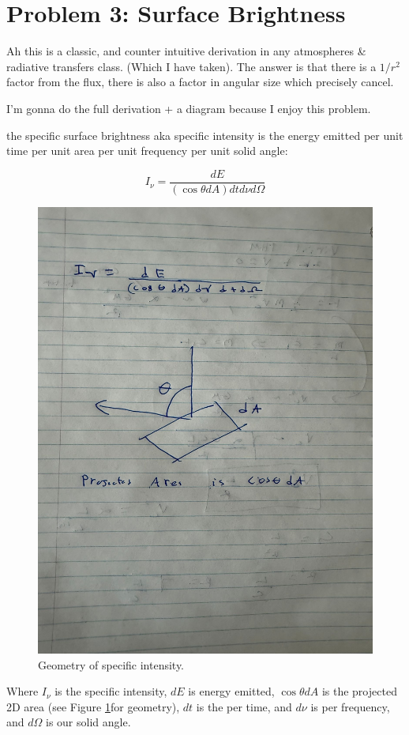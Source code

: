 \section*{Problem 3: Surface Brightness}

Ah this is a classic, and counter intuitive derivation in any atmospheres \& radiative transfers class.  (Which I have taken). The answer is that there is a $1/r^2$ factor from the flux, there is also a factor in angular size  which precisely cancel. 

I'm gonna do the full derivation + a diagram because I enjoy this problem. 

the specific surface brightness aka specific intensity is the energy emitted per unit time per unit area per unit frequency per unit solid angle:

\begin{equation}
    I_\nu = \frac{dE}{(\cos\theta dA)dtd\nu d\Omega}
\end{equation}

\begin{figure}
    \centering
    \includegraphics[width=0.75\linewidth]{images/problem_3_diagram.jpeg}
    \caption{Geometry of specific intensity.}
    \label{fig:probem_3_diagram}
\end{figure}

Where $ I_\nu$ is the specific intensity, $dE$ is energy emitted, $\cos\theta dA$ is the projected 2D area (see Figure \ref{fig:probem_3_diagram}for geometry), $dt$ is the per time, and $d\nu$ is per frequency, and $d\Omega$ is our solid angle. 




